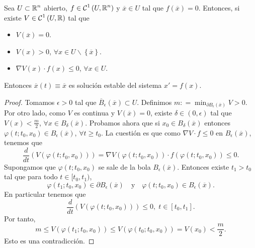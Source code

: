 \begin{theorem}
Sea $\displaystyle U \subset\mathbb{R}^{n} $ abierto, $\displaystyle f \in \mathcal{C}^{1}\left(U, \mathbb{R}^{n}\right) $ y $\displaystyle \overline{x}\in U $ tal que $\displaystyle f\left(\overline{x}\right)=0 $. Entonces, si existe $\displaystyle V\in \mathcal{C}^{1}\left(U, \mathbb{R}\right) $ tal que 
\begin{itemize}
\item $\displaystyle V\left(\overline{x}\right)=0 $.
\item $\displaystyle V\left(x\right) > 0 $, $\displaystyle \forall x \in U \backslash \left\{ \overline{x}\right\}  $. 
\item $\displaystyle \nabla V\left(x\right) \cdot f\left(x\right) \leq 0 $, $\displaystyle \forall x \in U   $. 
\end{itemize}
Entonces $\displaystyle \overline{x}\left(t\right)\equiv \overline{x} $ es solución estable del sistema $\displaystyle x ' = f\left(x\right) $. 
\end{theorem}
\begin{proof}
Tomamos $\displaystyle \epsilon > 0 $ tal que $\displaystyle \overline{B}_{\epsilon }\left(\overline{x}\right)\subset U$. Definimos $\displaystyle m : = \min_{\partial B_{\epsilon }\left(\overline{x}\right)}V > 0 $. Por otro lado, como $\displaystyle V $ es continua y $\displaystyle V\left(\overline{x}\right) = 0 $, existe $\displaystyle \delta \in \left(0,\epsilon \right) $ tal que $\displaystyle V\left(x\right) < \frac{m}{2} $, $\displaystyle \forall x \in B_{\delta }\left(\overline{x}\right) $. 
Probamos ahora que si $\displaystyle x_{0} \in B_{\delta }\left(\overline{x}\right) $ entonces $\displaystyle \varphi\left(t; t_{0}, x_{0}\right) \in B_{\epsilon }\left(\overline{x}\right) $, $\displaystyle \forall t \geq t_{0} $. 
La cuestión es que como $\displaystyle \nabla V \cdot f \leq 0 $ en $\displaystyle B_{\epsilon }\left(\overline{x}\right) $, tenemos que 
\[\frac{d}{dt}\left(V\left(\varphi\left(t; t_{0}, x_{0}\right)\right)\right)=\nabla V\left(\varphi\left(t; t_{0}, x_{0}\right)\right) \cdot f\left(\varphi\left(t; t_{0}, x_{0}\right)\right) \leq 0 .\]
Supongamos que $\displaystyle \varphi\left(t; t_{0}, x_{0}\right) $ se sale de la bola $\displaystyle B_{\epsilon }\left(\overline{x}\right) $. Entonces existe $\displaystyle t_{1} > t_{0} $ tal que para todo $\displaystyle t \in [t_{0}, t_{1}) $,
\[
\varphi\left(t_{1}; t_{0}, x_{0}\right)\in \partial B_{\epsilon }\left(\overline{x}\right) \quad \text{y} \quad 
\varphi\left(t; t_{0}, x_{0}\right)\in B_{\epsilon }\left(\overline{x}\right)
.\]
En particular tenemos que 
\[\frac{d}{dt}\left(V\left(\varphi\left(t; t_{0}, x_{0}\right)\right)\right)\leq 0, \; t \in [t_{0}, t_{1}] .\]
Por tanto,  
\[m \leq V\left(\varphi\left(t_{1}; t_{0}, x_{0}\right)\right)\leq V\left(\varphi\left(t_{0}; t_{0}, x_{0}\right)\right) = V\left(x_{0}\right)<\frac{m }{2} .\]
Esto es una contradicción. 
\end{proof}

